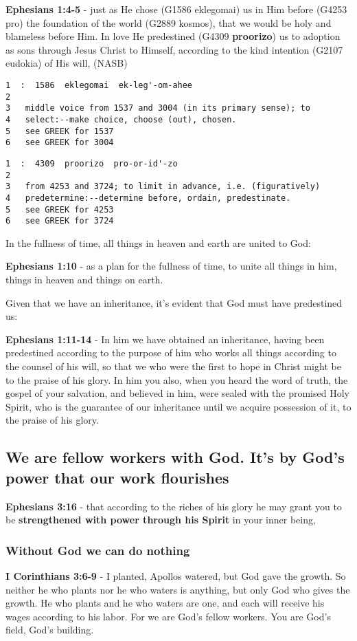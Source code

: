 \documentclass[11pt]{article}
\begin{document}
\textbf{Ephesians 1:4-5} - just as He chose (G1586 eklegomai) us in Him before (G4253 pro) the foundation of the world (G2889 kosmos), that we would be holy and blameless before Him. In love He predestined (G4309 \textbf{proorizo}) us to adoption as sons through Jesus Christ to Himself, according to the kind intention (G2107 eudokia) of His will, (NASB)

\begin{verbatim}
1  :  1586  eklegomai  ek-leg'-om-ahee
2  
3   middle voice from 1537 and 3004 (in its primary sense); to
4   select:--make choice, choose (out), chosen.
5   see GREEK for 1537
6   see GREEK for 3004
\end{verbatim}

\begin{verbatim}
1  :  4309  proorizo  pro-or-id'-zo
2  
3   from 4253 and 3724; to limit in advance, i.e. (figuratively)
4   predetermine:--determine before, ordain, predestinate.
5   see GREEK for 4253
6   see GREEK for 3724
\end{verbatim}

In the fullness of time, all things in heaven and earth are united to God:

\textbf{Ephesians 1:10} - as a plan for the fullness of time, to unite all things in him, things in heaven and things on earth.

Given that we have an inheritance, it's evident that God must have predestined us:

\textbf{Ephesians 1:11-14} - In him we have obtained an inheritance, having been predestined according to the purpose of him who works all things according to the counsel of his will, so that we who were the first to hope in Christ might be to the praise of his glory. In him you also, when you heard the word of truth, the gospel of your salvation, and believed in him, were sealed with the promised Holy Spirit, who is the guarantee of our inheritance until we acquire possession of it, to the praise of his glory.

\subsection{We are fellow workers with God. It's by God's power that our work flourishes}
\label{sec:org0e12d55}
\textbf{Ephesians 3:16} - that according to the riches of his glory he may grant you to be \textbf{strengthened with power through his Spirit} in your inner being,

\subsubsection{Without God we can do nothing}
\label{sec:org4d35ee5}
\textbf{I Corinthians 3:6-9} - I planted, Apollos watered, but God gave the growth. So neither he who plants nor he who waters is anything, but only God who gives the growth. He who plants and he who waters are one, and each will receive his wages according to his labor. For we are God's fellow workers. You are God's field, God's building.
\end{document}
